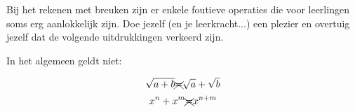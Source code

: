 \documentclass{ximera}
\begin{document}
\begin{proposition} \label{eig:rekenregels machten}\nl
 
    \savebox\strutbox{$\vphantom{\dfrac11^n}$}   %
 
 
 


\end{proposition}





Bij het rekenen met breuken zijn er enkele foutieve operaties die voor leerlingen soms erg aanlokkelijk zijn. 
Doe jezelf (en je leerkracht...) een plezier en overtuig jezelf dat de volgende uitdrukkingen verkeerd zijn. 

\begin{remark} In het algemeen geldt niet:
    
    \renewcommand\CancelColor{\color{red}}
    

$$ \sqrt{a+b} \xcancel{=} \sqrt{a} + \sqrt{b}$$ 
$$ x^n + x^m \xcancel{=} x^{n+m} $$      
    
\end{remark}
\end{document}
